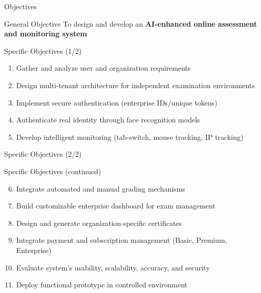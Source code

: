 \begin{frame}{Objectives}
    \begin{block}{General Objective}
        To design and develop an \textbf{AI-enhanced online assessment and monitoring system}
    \end{block}
    
    \begin{block}{Specific Objectives (1/2)}
        \begin{enumerate}
            \item Gather and analyze user and organization requirements
            \item Design multi-tenant architecture for independent examination environments
            \item Implement secure authentication (enterprise IDs/unique tokens)
            \item Authenticate real identity through face recognition models
            \item Develop intelligent monitoring (tab-switch, mouse tracking, IP tracking)
        \end{enumerate}
    \end{block}
\end{frame}

\begin{frame}{Specific Objectives (2/2)}
    \begin{block}{Specific Objectives (continued)}
        \begin{enumerate}
            \setcounter{enumi}{5}
            \item Integrate automated and manual grading mechanisms
            \item Build customizable enterprise dashboard for exam management
            \item Design and generate organization-specific certificates
            \item Integrate payment and subscription management (Basic, Premium, Enterprise)
            \item Evaluate system's usability, scalability, accuracy, and security
            \item Deploy functional prototype in controlled environment
        \end{enumerate}
    \end{block}
\end{frame}

